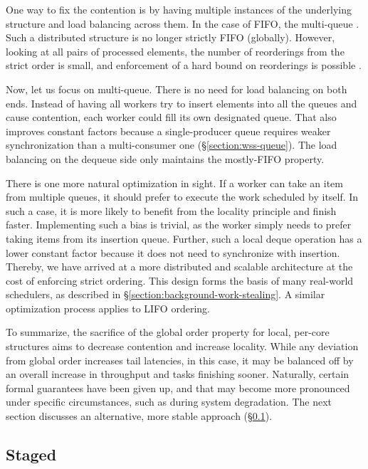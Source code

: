 \documentclass[12pt,a4paper,twoside]{report}
\begin{document}
One way to fix the contention is by having multiple instances of the underlying structure and load balancing across them. In the case of FIFO, the multi-queue \cite{Postnikova2022}. Such a distributed structure is no longer strictly FIFO (globally). However, looking at all pairs of processed elements, the number of reorderings from the strict order is small, and enforcement of a hard bound on reorderings is possible \cite{Kirsch2013}. 

Now, let us focus on multi-queue. There is no need for load balancing on both ends. Instead of having all workers try to insert elements into all the queues and cause contention, each worker could fill its own designated queue. That also improves constant factors because a single-producer queue requires weaker synchronization than a multi-consumer one (\S\ref{section:wss-queue}). The load balancing on the dequeue side only maintains the mostly-FIFO property. 

There is one more natural optimization in sight. If a worker can take an item from multiple queues, it should prefer to execute the work scheduled by itself. In such a case, it is more likely to benefit from the locality principle and finish faster. Implementing such a bias is trivial, as the worker simply needs to prefer taking items from its insertion queue. Further, such a local deque operation has a lower constant factor because it does not need to synchronize with insertion. Thereby, we have arrived at a more distributed and scalable architecture at the cost of enforcing strict ordering. This design forms the basis of many real-world schedulers, as described in \S\ref{section:background-work-stealing}. A similar optimization process applies to LIFO ordering.

To summarize, the sacrifice of the global order property for local, per-core structures aims to decrease contention and increase locality. While any deviation from global order increases tail latencies, in this case, it may be balanced off by an overall increase in throughput and tasks finishing sooner. Naturally, certain formal guarantees have been given up, and that may become more pronounced under specific circumstances, such as during system degradation. The next section discusses an alternative, more stable approach (\S\ref{section:design-staged}).
    
\subsection{Staged}
\label{section:design-staged}
\end{document}
